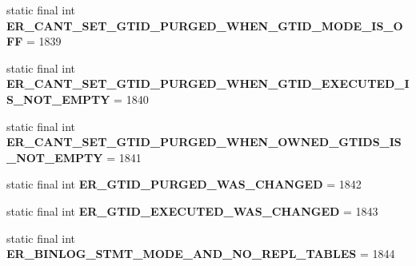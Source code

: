 \begin{DoxyCompactItemize}
\item 
\mbox{\label{classcom_1_1mysql_1_1cj_1_1exceptions_1_1_mysql_error_numbers_aa3781c0fb9500807c0f587e87625d56c}} 
static final int {\bfseries E\+R\+\_\+\+C\+A\+N\+T\+\_\+\+S\+E\+T\+\_\+\+G\+T\+I\+D\+\_\+\+P\+U\+R\+G\+E\+D\+\_\+\+W\+H\+E\+N\+\_\+\+G\+T\+I\+D\+\_\+\+M\+O\+D\+E\+\_\+\+I\+S\+\_\+\+O\+FF} = 1839
\item 
\mbox{\label{classcom_1_1mysql_1_1cj_1_1exceptions_1_1_mysql_error_numbers_ad3669fc129f55cb625a8a7a883218bbb}} 
static final int {\bfseries E\+R\+\_\+\+C\+A\+N\+T\+\_\+\+S\+E\+T\+\_\+\+G\+T\+I\+D\+\_\+\+P\+U\+R\+G\+E\+D\+\_\+\+W\+H\+E\+N\+\_\+\+G\+T\+I\+D\+\_\+\+E\+X\+E\+C\+U\+T\+E\+D\+\_\+\+I\+S\+\_\+\+N\+O\+T\+\_\+\+E\+M\+P\+TY} = 1840
\item 
\mbox{\label{classcom_1_1mysql_1_1cj_1_1exceptions_1_1_mysql_error_numbers_a1f56b50867e74b290230fc9c7948b29b}} 
static final int {\bfseries E\+R\+\_\+\+C\+A\+N\+T\+\_\+\+S\+E\+T\+\_\+\+G\+T\+I\+D\+\_\+\+P\+U\+R\+G\+E\+D\+\_\+\+W\+H\+E\+N\+\_\+\+O\+W\+N\+E\+D\+\_\+\+G\+T\+I\+D\+S\+\_\+\+I\+S\+\_\+\+N\+O\+T\+\_\+\+E\+M\+P\+TY} = 1841
\item 
\mbox{\label{classcom_1_1mysql_1_1cj_1_1exceptions_1_1_mysql_error_numbers_ab02b435cc266ec6f2657ad752f8105d1}} 
static final int {\bfseries E\+R\+\_\+\+G\+T\+I\+D\+\_\+\+P\+U\+R\+G\+E\+D\+\_\+\+W\+A\+S\+\_\+\+C\+H\+A\+N\+G\+ED} = 1842
\item 
\mbox{\label{classcom_1_1mysql_1_1cj_1_1exceptions_1_1_mysql_error_numbers_afbd233adc28478f1e5eb8f092e1c9d8d}} 
static final int {\bfseries E\+R\+\_\+\+G\+T\+I\+D\+\_\+\+E\+X\+E\+C\+U\+T\+E\+D\+\_\+\+W\+A\+S\+\_\+\+C\+H\+A\+N\+G\+ED} = 1843
\item 
\mbox{\label{classcom_1_1mysql_1_1cj_1_1exceptions_1_1_mysql_error_numbers_a542b56acf511b64313f2dcb3a118286a}} 
static final int {\bfseries E\+R\+\_\+\+B\+I\+N\+L\+O\+G\+\_\+\+S\+T\+M\+T\+\_\+\+M\+O\+D\+E\+\_\+\+A\+N\+D\+\_\+\+N\+O\+\_\+\+R\+E\+P\+L\+\_\+\+T\+A\+B\+L\+ES} = 1844

\end{DoxyCompactItemize}
